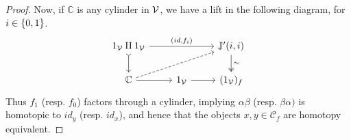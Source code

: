 \documentclass[a4paper,10pt
,draft
]{article}%
\newcommand{\J}{\mathbb J}
\renewcommand{\1}{\ensuremath{\mathbb{id}}}
\begin{document}
\begin{proof}
      Now, if $\mathbb C$ is any cylinder in $\mathcal V$, we have a lift in the following diagram, for $i \in \left\{0,1\right\}$.
      \begin{equation}
            \label{J11_CYL_EQ}
            \begin{tikzcd}
                  1_\V \amalg 1_\V \arrow[rr, "{(id, f_i)}"] \arrow[d, tail]
                  &&
                  \J'(i,i) \arrow[d, "\sim", two heads]
                  \\
                  \mathbb C \arrow[r] \arrow[urr, dashed]
                  &
                  1_\V \arrow[r]
                  &
                  (1_\V)_f
              \end{tikzcd}
        \end{equation}
        Thus $f_1$ (resp. $f_0$) factors through a cylinder,
        implying $\alpha\beta$ (resp. $\beta\alpha)$ is homotopic to $id_y$ (resp. $id_x$),
        and hence that the objects $x,y\in \mathcal C_f$ are homotopy equivalent.
  \end{proof}
  
\end{document}
